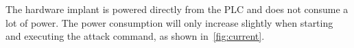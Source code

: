 The hardware implant is powered directly from the PLC and does not consume a lot of power. The power consumption will only increase slightly when starting and executing the attack command, as shown in~\autoref{fig:current}.



%
%
%
%
%
%
%
%
%
%
